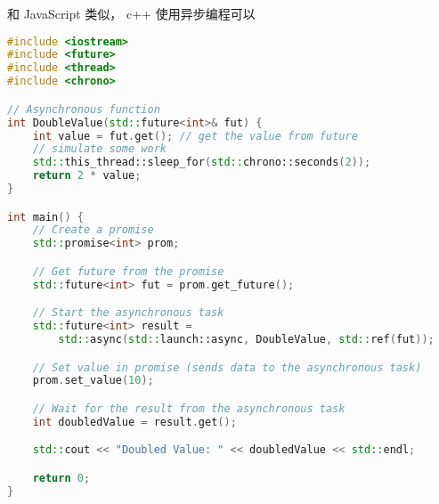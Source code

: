 
和 JavaScript 类似， c++ 使用异步编程可以

\begin{lstlisting}[language=cpp]
#include <iostream>
#include <future>
#include <thread>
#include <chrono>

// Asynchronous function
int DoubleValue(std::future<int>& fut) {
    int value = fut.get(); // get the value from future
    // simulate some work
    std::this_thread::sleep_for(std::chrono::seconds(2));
    return 2 * value;
}

int main() {
    // Create a promise
    std::promise<int> prom;

    // Get future from the promise
    std::future<int> fut = prom.get_future();

    // Start the asynchronous task
    std::future<int> result =
        std::async(std::launch::async, DoubleValue, std::ref(fut));

    // Set value in promise (sends data to the asynchronous task)
    prom.set_value(10);

    // Wait for the result from the asynchronous task
    int doubledValue = result.get();

    std::cout << "Doubled Value: " << doubledValue << std::endl;

    return 0;
}
\end{lstlisting}

